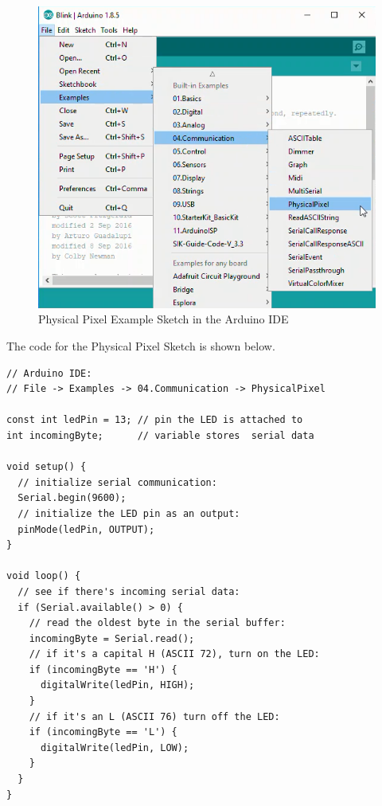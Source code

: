 \documentclass{book}
\makeatletter
\def\maxwidth{\ifdim\Gin@nat@width>\linewidth\linewidth
    \else\Gin@nat@width\fi}
\let\Oldincludegraphics\includegraphics
\renewcommand{\includegraphics}[1]{\Oldincludegraphics[width=.8\maxwidth]{#1}}
\makeatother
\begin{document}
\begin{figure}
\centering
\includegraphics{images/file-examples-communication-physicalpixel.png}
\caption{Physical Pixel Example Sketch in the Arduino IDE}
\end{figure}

The code for the Physical Pixel Sketch is shown below.
    




    
        \begin{lstlisting}
// Arduino IDE: 
// File -> Examples -> 04.Communication -> PhysicalPixel

const int ledPin = 13; // pin the LED is attached to
int incomingByte;      // variable stores  serial data

void setup() {
  // initialize serial communication:
  Serial.begin(9600);
  // initialize the LED pin as an output:
  pinMode(ledPin, OUTPUT);
}

void loop() {
  // see if there's incoming serial data:
  if (Serial.available() > 0) {
    // read the oldest byte in the serial buffer:
    incomingByte = Serial.read();
    // if it's a capital H (ASCII 72), turn on the LED:
    if (incomingByte == 'H') {
      digitalWrite(ledPin, HIGH);
    }
    // if it's an L (ASCII 76) turn off the LED:
    if (incomingByte == 'L') {
      digitalWrite(ledPin, LOW);
    }
  }
}
\end{lstlisting}
    
\end{document}
